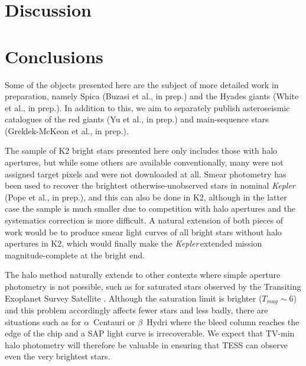 \documentclass[modern]{aastex62}
\newcommand\kepler{\emph{Kepler}\,}
\begin{document}
\section{Discussion}
\label{sec:discussion}





\section{Conclusions}
\label{sec:conclusions}


Some of the objects presented here are the subject of more detailed work in preparation, namely Spica (Buzasi et al., in prep.) and the Hyades giants (White et al., in prep.). In addition to this, we aim to separately publish asteroseismic catalogues of the red giants (Yu et al., in prep.) and main-sequence stars (Greklek-McKeon et al., in prep.). 

The sample of K2 bright stars presented here only includes those with halo apertures, but while some others are available conventionally, many were not assigned target pixels and were not downloaded at all. Smear photometry has been used to recover the brightest otherwise-unobserved stars in nominal \kepler (Pope et al., in prep.), and this can also be done in K2, although in the latter case the sample is much smaller due to competition with halo apertures and the systematics correction is more difficult. A natural extension of both pieces of work would be to produce smear light curves of all bright stars without halo apertures in K2, which would finally make the \kepler extended mission magnitude-complete at the bright end. 

The halo method naturally extends to other contexts where simple aperture photometry is not possible, such as for saturated stars observed by the Transiting Exoplanet Survey Satellite \citep[TESS;][]{tess}. Although the saturation limit is brighter ($T_{mag} \sim 6$) and this problem accordingly affects fewer stars and less badly, there are situations such as for $\alpha$~Centauri or $\beta$~Hydri where the bleed column reaches the edge of the chip and a SAP light curve is irrecoverable. We expect that TV-min halo photometry will therefore be valuable in ensuring that TESS can observe even the very brightest stars.
\end{document}
